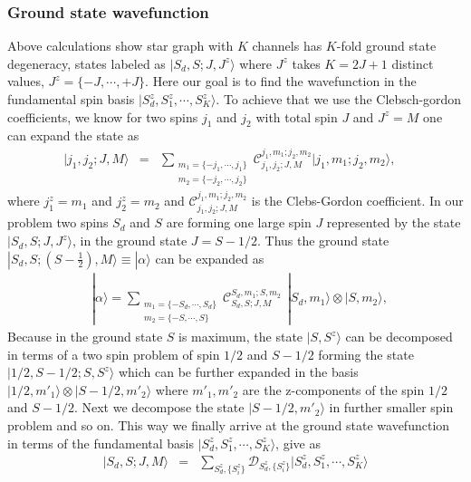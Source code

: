 \documentclass[reprint,prb,superscriptaddress]{revtex4-2}
\begin{document}
\subsubsection{Ground state wavefunction}
\noindent Above calculations show star graph with $K$ channels has $K$-fold ground state degeneracy, states labeled as $|S_d,S;J,J^z\rangle$ where $J^z$ takes $K=2J+1$ distinct values, $J^z=\{-J,\cdots,+J \}$. Here our goal is to find the wavefunction in the fundamental spin basis $|S_d^z,S_1^z,\cdots,S_K^z\rangle$. To achieve that we use the Clebsch-gordon coefficients, we know for two spins $j_1$ and $j_2$  with total spin $J$ and $J^z=M$ one can expand the state as 
\begin{eqnarray}
|j_1,j_2;J,M\rangle &=& \displaystyle\sum_{\substack{m_1=\{-j_1,\cdots,j_1\} \\ m_2=\{-j_2,\cdots,j_2\} }}   \mathcal{C}^{j_1,m_1;j_2,m_2}_{j_1,j_2;J,M} |j_1,m_1;j_2,m_2 \rangle ,~~~~
\end{eqnarray}
where $j_1^z=m_1$ and $j_2^z=m_2$ and $\mathcal{C}^{j_1,m_1;j_2,m_2}_{j_1,j_2;J,M}$ is the Clebs-Gordon coefficient. In our problem two spins $S_d$ and $S$ are forming one large spin $J$ represented by the state $|S_d,S;J,J^z\rangle$, in the ground state $J=S-1/2$. Thus the ground state $|S_d,S; (S-\frac{1}{2} ),M\rangle \equiv |\alpha\rangle$ can be expanded as
\begin{eqnarray}
&&|\alpha\rangle= \displaystyle\sum_{\substack{m_1=\{-S_d,\cdots,S_d\} \\ m_2=\{-S,\cdots,S\} }} \mathcal{C}^{S_d,m_1;S,m_2}_{S_d,S;J,M} ~~   | S_d,m_1 \rangle \otimes  |S,m_2  \rangle ,~~~~
\end{eqnarray}
Because in the ground state $S$ is maximum, the state $|S,S^z\rangle$ can be decomposed in terms of a two spin problem of spin $1/2$ and $S-1/2$ forming the state $|1/2,S-1/2;S,S^z\rangle$ which can be further expanded in the basis $ |1/2,m'_1 \rangle \otimes  |S-1/2,m'_2  \rangle $ where $m'_1,m'_2$ are the z-components of the spin $1/2$ and $S-1/2$. Next we decompose the state $|S-1/2,m'_2\rangle$ in further smaller spin problem and so on. This way we finally arrive at the ground state wavefunction in terms of the fundamental basis $|S_d^z,S_1^z,\cdots,S_K^z\rangle$, give as
\begin{eqnarray}
|S_d,S;J,M\rangle &=& \sum_{S_d^z,\{S_i^z\}} \mathcal{D}_{S_d^z,\{S_i^z\}} |S_d^z,S_1^z,\cdots,S_K^z\rangle
\end{eqnarray}
\end{document}
